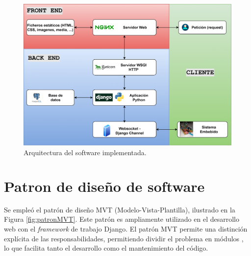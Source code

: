 \begin{figure}[H]
    \centering
    \includegraphics[width=1\linewidth]{Figuras/AplicacionWeb/arquitecturaSoft.png}
    \caption{Arquitectura del software implementada.}
    \label{fig:arquitecturaSoft}
\end{figure}

\section{Patron de diseño de software}
Se empleó el patrón de diseño MVT (Modelo-Vista-Plantilla), ilustrado en la Figura \ref{fig:patronMVT}. Este patrón es ampliamente utilizado en el desarrollo web con el \textit{framework} de trabajo Django. El patrón MVT permite una distinción explícita de las responsabilidades, permitiendo dividir el problema en módulos , lo que facilita tanto el desarrollo como el mantenimiento del código. 

